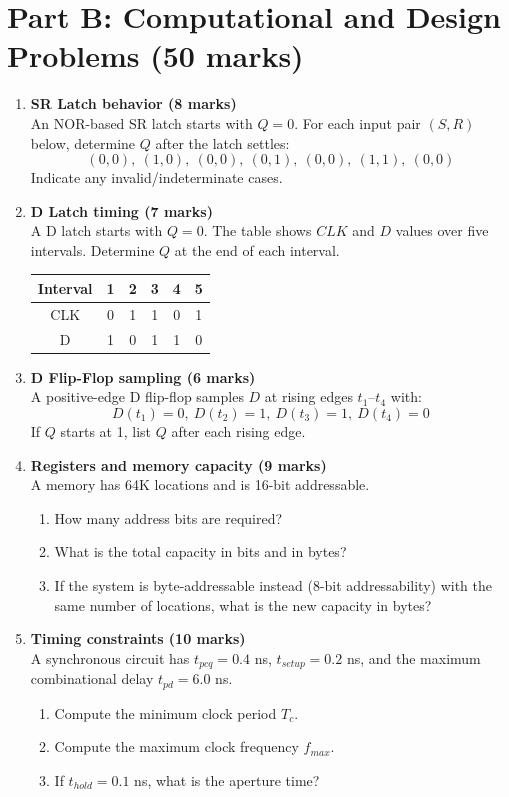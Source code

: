 \documentclass[11pt]{article}
\begin{document}
\section*{Part B: Computational and Design Problems (50 marks)}
\begin{enumerate}[label=\textbf{B\arabic*.}]
  \item \textbf{SR Latch behavior (8 marks)}\\
  An NOR-based SR latch starts with $Q=0$. For each input pair $(S,R)$ below, determine $Q$ after the latch settles:
  \[
  (0,0),\ (1,0),\ (0,0),\ (0,1),\ (0,0),\ (1,1),\ (0,0)
  \]
  Indicate any invalid/indeterminate cases.

  \item \textbf{D Latch timing (7 marks)}\\
  A D latch starts with $Q=0$. The table shows $CLK$ and $D$ values over five intervals. Determine $Q$ at the end of each interval.
  \begin{center}
  \begin{tabular}{c|ccccc}
  Interval & 1 & 2 & 3 & 4 & 5 \\ \hline
  CLK & 0 & 1 & 1 & 0 & 1 \\
  D   & 1 & 0 & 1 & 1 & 0 \\
  \end{tabular}
  \end{center}

  \item \textbf{D Flip-Flop sampling (6 marks)}\\
  A positive-edge D flip-flop samples $D$ at rising edges $t_1$--$t_4$ with:
  \[
  D(t_1)=0,\ D(t_2)=1,\ D(t_3)=1,\ D(t_4)=0
  \]
  If $Q$ starts at 1, list $Q$ after each rising edge.

  \item \textbf{Registers and memory capacity (9 marks)}\\
  A memory has 64K locations and is 16-bit addressable.
  \begin{enumerate}[label=(\alph*)]
    \item How many address bits are required?
    \item What is the total capacity in bits and in bytes?
    \item If the system is byte-addressable instead (8-bit addressability) with the same number of locations, what is the new capacity in bytes?
  \end{enumerate}

  \item \textbf{Timing constraints (10 marks)}\\
  A synchronous circuit has $t_{pcq}=0.4$ ns, $t_{setup}=0.2$ ns, and the maximum combinational delay $t_{pd}=6.0$ ns.
  \begin{enumerate}[label=(\alph*)]
    \item Compute the minimum clock period $T_c$.
    \item Compute the maximum clock frequency $f_{max}$.
    \item If $t_{hold}=0.1$ ns, what is the aperture time?
  \end{enumerate}


\end{enumerate}
\end{document}
